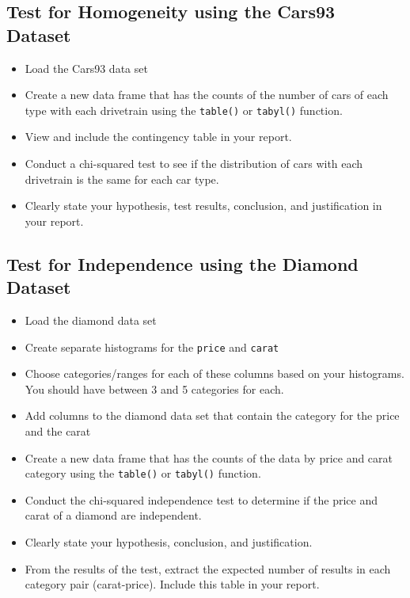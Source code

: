 \documentclass{article}
\begin{document}
\subsection*{Test for Homogeneity using the Cars93 Dataset}

\begin{itemize}
    \item Load the Cars93 data set
    \item Create a new data frame that has the counts of the number of cars of each type with each drivetrain using the \texttt{table()} or \texttt{tabyl()} function.
    \item View and include the contingency table in your report.
    \item Conduct a chi-squared test to see if the distribution of cars with each drivetrain is the same for each car type.
    \item Clearly state your hypothesis, test results, conclusion, and justification in your report.
\end{itemize}

\subsection*{Test for Independence using the Diamond Dataset}

\begin{itemize}
    \item Load the diamond data set
    \item Create separate histograms for the \texttt{price} and \texttt{carat}
    \item Choose categories/ranges for each of these columns based on your histograms. You should have between 3 and 5 categories for each.
    \item Add columns to the diamond data set that contain the category for the price and the carat
    \item Create a new data frame that has the counts of the data by price and carat category using the \texttt{table()} or \texttt{tabyl()} function.
    \item Conduct the chi-squared independence test to determine if the price and carat of a diamond are independent.
    \item Clearly state your hypothesis, conclusion, and justification.
    \item From the results of the test, extract the expected number of results in each category pair (carat-price). Include this table in your report.
\end{itemize}
\newpage
\end{document}
